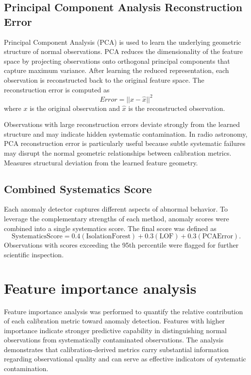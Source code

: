 \documentclass[linenumbers,trackchanges]{aastex701}
\begin{document}
\subsection{Principal Component Analysis Reconstruction Error}
Principal Component Analysis (PCA) is used to learn the underlying geometric structure of normal observations. PCA reduces the dimensionality of the feature space by projecting observations onto orthogonal principal components that capture maximum variance. After learning the reduced representation, each observation is reconstructed back to the original feature space.
The reconstruction error is computed as
\begin{equation}
Error = ||x-\hat{x}||^2
\end{equation}
where $x$ is the original observation and $\hat{x}$ is the reconstructed observation.

Observations with large reconstruction errors deviate strongly from the learned structure and may indicate hidden systematic contamination. In radio astronomy, PCA reconstruction error is particularly useful because subtle systematic failures may disrupt the normal geometric relationships between calibration metrics.
Measures structural deviation from the learned feature geometry.

\subsection{Combined Systematics Score}
Each anomaly detector captures different aspects of abnormal behavior. To leverage the complementary strengths of each method, anomaly scores were combined into a single systematics score. The final score was defined as
\begin{equation}
\textrm{SystematicsScore}=0.4(\textrm{IsolationForest})+0.3(\textrm{LOF})+0.3(\textrm{PCAError}).
\end{equation}
Observations with scores exceeding the 95th percentile were flagged for further scientific inspection.

\section{Feature importance analysis}
Feature importance analysis was performed to quantify the relative contribution of each calibration metric toward anomaly detection. Features with higher importance indicate stronger predictive capability in distinguishing normal observations from systematically contaminated observations. The analysis demonstrates that calibration-derived metrics carry substantial information regarding observational quality and can serve as effective indicators of systematic contamination.
\end{document}
